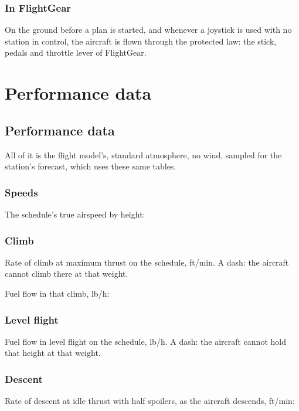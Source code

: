 \documentclass[11pt,a4paper,oneside]{book}
\newcommand{\Tab}[1]{}
\begin{document}
\section{In FlightGear}
On the ground before a plan is started, and whenever a joystick is used with no station in control, the aircraft is
flown through the protected law: the stick, pedals and throttle lever of FlightGear.

\part{Performance data}
\chapter{Performance data}\label{ch:perf}
All of it is the flight model's, standard atmosphere, no wind, sampled for the station's forecast, which uses these
same tables.

\section{Speeds}
The schedule's true airspeed by height:
\begin{center}\small\Tab{perf_speed}\end{center}

\section{Climb}
Rate of climb at maximum thrust on the schedule, ft/min. A dash: the aircraft cannot climb there at that weight.
\begin{center}\small\Tab{perf_climb}\end{center}
Fuel flow in that climb, lb/h:
\begin{center}\small\Tab{perf_climbfuel}\end{center}

\section{Level flight}
Fuel flow in level flight on the schedule, lb/h. A dash: the aircraft cannot hold that height at that weight.
\begin{center}\small\Tab{perf_level}\end{center}

\section{Descent}
Rate of descent at idle thrust with half spoilers, as the aircraft descends, ft/min:
\begin{center}\small\Tab{perf_descent}\end{center}
\end{document}
